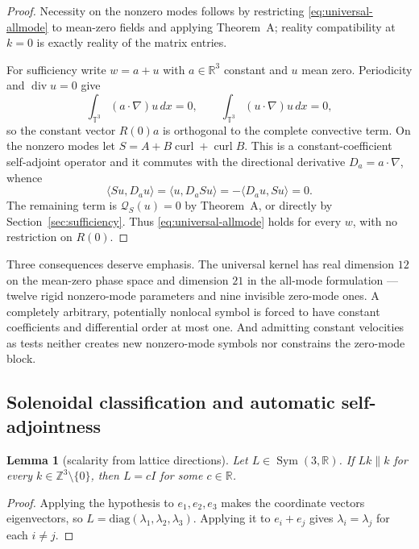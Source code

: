 \documentclass[11pt]{article}
\newtheorem{lemma}[theorem]{Lemma}
\theoremstyle{definition}
\theoremstyle{remark}
\theoremstyle{plain}
\DeclareMathOperator{\curl}{curl}
\DeclareMathOperator{\dv}{div}
\DeclareMathOperator{\Sym}{Sym}
\newcommand{\T}{\mathbb{T}}
\newcommand{\Z}{\mathbb{Z}}
\newcommand{\R}{\mathbb{R}}
\newcommand{\Qform}{\mathcal{Q}}
\begin{document}
\begin{proof}
Necessity on the nonzero modes follows by restricting
\eqref{eq:universal-allmode} to mean-zero fields and applying Theorem~A;
reality compatibility at $k=0$ is exactly reality of the matrix entries.

For sufficiency write $w=a+u$ with $a\in\R^{3}$ constant and $u$ mean zero.
Periodicity and $\dv u=0$ give
\begin{equation}
\label{eq:zeromean}
\int_{\T^{3}}(a\cdot\nabla)u\,dx=0,
\qquad
\int_{\T^{3}}(u\cdot\nabla)u\,dx=0,
\end{equation}
so the constant vector $R(0)a$ is orthogonal to the complete convective term.
On the nonzero modes let $S=A+B\curl+\curl B$. This is a constant-coefficient
self-adjoint operator and it commutes with the directional derivative
$D_{a}=a\cdot\nabla$, whence
\begin{equation}
\label{eq:commute}
\langle Su,D_{a}u\rangle
=\langle u,D_{a}Su\rangle
=-\langle D_{a}u,Su\rangle=0 .
\end{equation}
The remaining term is $\Qform_{S}(u)=0$ by Theorem~A, or directly by
Section~\ref{sec:sufficiency}. Thus \eqref{eq:universal-allmode} holds for
every $w$, with no restriction on $R(0)$.
\end{proof}

Three consequences deserve emphasis. The universal kernel has real dimension
$12$ on the mean-zero phase space and dimension $21$ in the all-mode
formulation --- twelve rigid nonzero-mode parameters and nine invisible
zero-mode ones. A completely arbitrary, potentially nonlocal symbol is forced
to have constant coefficients and differential order at most one. And admitting
constant velocities as tests neither creates new nonzero-mode symbols nor
constrains the zero-mode block.

\subsection{Solenoidal classification and automatic self-adjointness}
\label{subsec:corB}

\begin{lemma}[scalarity from lattice directions]
\label{lem:scalarity}
Let $L\in\Sym(3,\R)$. If $Lk\parallel k$ for every $k\in\Z^{3}\setminus\{0\}$,
then $L=cI$ for some $c\in\R$.
\end{lemma}

\begin{proof}
Applying the hypothesis to $e_{1},e_{2},e_{3}$ makes the coordinate vectors
eigenvectors, so $L=\mathrm{diag}(\lambda_{1},\lambda_{2},\lambda_{3})$.
Applying it to $e_{i}+e_{j}$ gives $\lambda_{i}=\lambda_{j}$ for each $i\ne j$.
\end{proof}
\end{document}
